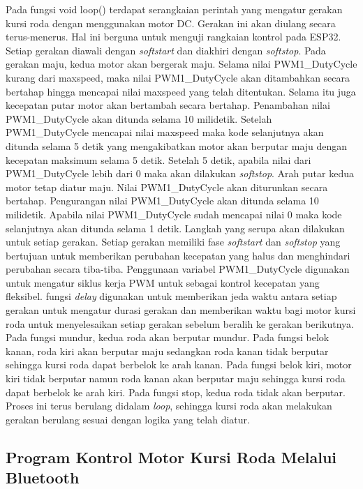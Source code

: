 Pada fungsi void loop() terdapat serangkaian perintah yang mengatur gerakan kursi roda dengan menggunakan motor DC. Gerakan ini akan diulang secara terus-menerus. Hal ini berguna untuk menguji rangkaian kontrol pada ESP32. Setiap gerakan diawali dengan \emph{softstart} dan diakhiri dengan \emph{softstop}. Pada gerakan maju, kedua motor akan bergerak maju. Selama nilai PWM1\_DutyCycle kurang dari maxspeed, maka nilai PWM1\_DutyCycle akan ditambahkan secara bertahap hingga mencapai nilai maxspeed yang telah ditentukan. Selama itu juga kecepatan putar motor akan bertambah secara bertahap. Penambahan nilai PWM1\_DutyCycle akan ditunda selama 10 milidetik. Setelah PWM1\_DutyCycle mencapai nilai maxspeed maka kode selanjutnya akan ditunda selama 5 detik yang mengakibatkan motor akan berputar maju dengan kecepatan maksimum selama 5 detik. Setelah 5 detik, apabila nilai dari PWM1\_DutyCycle lebih dari 0 maka akan dilakukan \emph{softstop}. Arah putar kedua motor tetap diatur maju. Nilai PWM1\_DutyCycle akan diturunkan secara bertahap. Pengurangan nilai PWM1\_DutyCycle akan ditunda selama 10 milidetik. Apabila nilai PWM1\_DutyCycle sudah mencapai nilai 0 maka kode selanjutnya akan ditunda selama 1 detik. Langkah yang serupa akan dilakukan untuk setiap gerakan. Setiap gerakan memiliki fase \emph{softstart} dan \emph{softstop} yang bertujuan untuk memberikan perubahan kecepatan yang halus dan menghindari perubahan secara tiba-tiba. Penggunaan variabel PWM1\_DutyCycle digunakan untuk mengatur siklus kerja PWM untuk sebagai kontrol kecepatan yang fleksibel. fungsi \emph{delay} digunakan untuk memberikan jeda waktu antara setiap gerakan untuk mengatur durasi gerakan dan memberikan waktu bagi motor kursi roda untuk menyelesaikan setiap gerakan sebelum beralih ke gerakan berikutnya. Pada fungsi mundur, kedua roda akan berputar mundur. Pada fungsi belok kanan, roda kiri akan berputar maju sedangkan roda kanan tidak berputar sehingga kursi roda dapat berbelok ke arah kanan. Pada fungsi belok kiri, motor kiri tidak berputar namun roda kanan akan berputar maju sehingga kursi roda dapat berbelok ke arah kiri. Pada fungsi stop, kedua roda tidak akan berputar. Proses ini terus berulang didalam \emph{loop}, sehingga kursi roda akan melakukan gerakan berulang sesuai dengan logika yang telah diatur.


\subsection{Program Kontrol Motor Kursi Roda Melalui Bluetooth}

